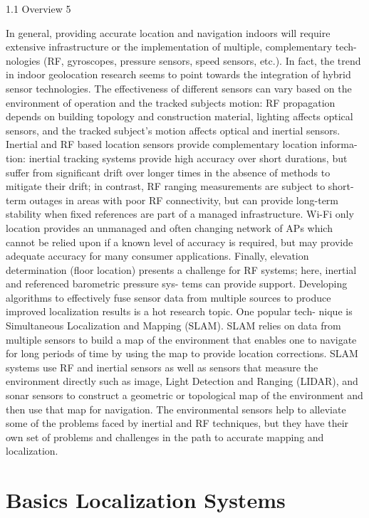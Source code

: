 1.1 Overview 5


In general, providing accurate location and navigation indoors will require
extensive infrastructure or the implementation of multiple, complementary tech-
nologies (RF, gyroscopes, pressure sensors, speed sensors, etc.). In fact, the trend
in indoor geolocation research seems to point towards the integration of hybrid
sensor technologies. The effectiveness of different sensors can vary based on the
environment of operation and the tracked subjects motion: RF propagation
depends on building topology and construction material, lighting affects optical
sensors, and the tracked subject’s motion affects optical and inertial sensors.
Inertial and RF based location sensors provide complementary location informa-
tion: inertial tracking systems provide high accuracy over short durations, but
suffer from significant drift over longer times in the absence of methods to mitigate
their drift; in contrast, RF ranging measurements are subject to short-term outages
in areas with poor RF connectivity, but can provide long-term stability when fixed
references are part of a managed infrastructure. Wi-Fi only location provides an
unmanaged and often changing network of APs which cannot be relied upon if a
known level of accuracy is required, but may provide adequate accuracy for many
consumer applications. Finally, elevation determination (floor location) presents a
challenge for RF systems; here, inertial and referenced barometric pressure sys-
tems can provide support.
Developing algorithms to effectively fuse sensor data from multiple sources to
produce improved localization results is a hot research topic. One popular tech-
nique is Simultaneous Localization and Mapping (SLAM). SLAM relies on data
from multiple sensors to build a map of the environment that enables one to
navigate for long periods of time by using the map to provide location corrections.
SLAM systems use RF and inertial sensors as well as sensors that measure the
environment directly such as image, Light Detection and Ranging (LIDAR), and
sonar sensors to construct a geometric or topological map of the environment and
then use that map for navigation. The environmental sensors help to alleviate some
of the problems faced by inertial and RF techniques, but they have their own set of
problems and challenges in the path to accurate mapping and localization.




\section{Basics Localization Systems}

